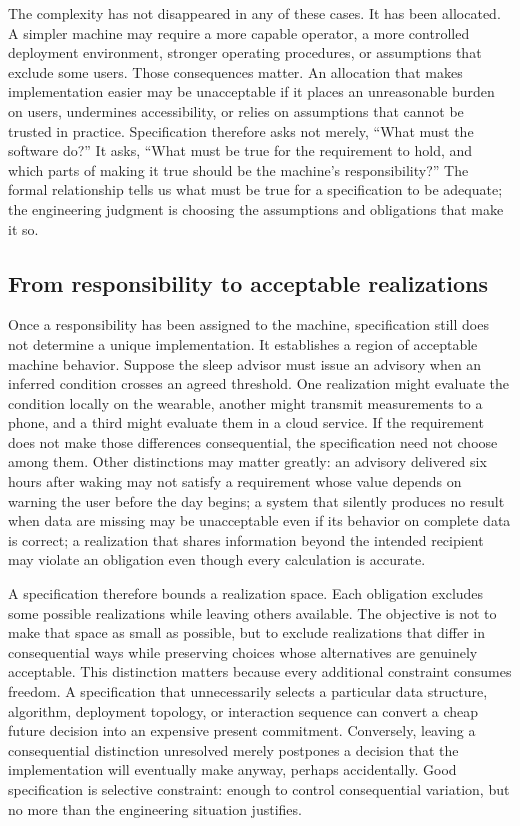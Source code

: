 The complexity has not disappeared in any of these cases. It has been allocated. A simpler machine
may require a more capable operator, a more controlled deployment environment, stronger operating
procedures, or assumptions that exclude some users. Those consequences matter. An allocation that
makes implementation easier may be unacceptable if it places an unreasonable burden on users,
undermines accessibility, or relies on assumptions that cannot be trusted in practice.
Specification therefore asks not merely, ``What must the software do?'' It asks, ``What must be true
for the requirement to hold, and which parts of making it true should be the machine's
responsibility?'' The formal relationship tells us what must be true for a specification to be
adequate; the engineering judgment is choosing the assumptions and obligations that make it so.

\subsection{From responsibility to acceptable realizations}\label{sec-acceptable-realizations}

Once a responsibility has been assigned to the machine, specification still does not determine a
unique implementation. It establishes a region of acceptable machine behavior. Suppose the sleep
advisor must issue an advisory when an inferred condition crosses an agreed threshold. One
realization might evaluate the condition locally on the wearable, another might transmit
measurements to a phone, and a third might evaluate them in a cloud service. If the requirement
does not make those differences consequential, the specification need not choose among them. Other
distinctions may matter greatly: an advisory delivered six hours after waking may not satisfy a
requirement whose value depends on warning the user before the day begins; a system that silently
produces no result when data are missing may be unacceptable even if its behavior on complete data
is correct; a realization that shares information beyond the intended recipient may violate an
obligation even though every calculation is accurate.

A specification therefore bounds a realization space. Each obligation excludes some possible
realizations while leaving others available. The objective is not to make that space as small as
possible, but to exclude realizations that differ in consequential ways while preserving choices
whose alternatives are genuinely acceptable. This distinction matters because every additional
constraint consumes freedom. A specification that unnecessarily selects a particular data
structure, algorithm, deployment topology, or interaction sequence can convert a cheap future
decision into an expensive present commitment. Conversely, leaving a consequential distinction
unresolved merely postpones a decision that the implementation will eventually make anyway, perhaps
accidentally. Good specification is selective constraint: enough to control consequential
variation, but no more than the engineering situation justifies.

